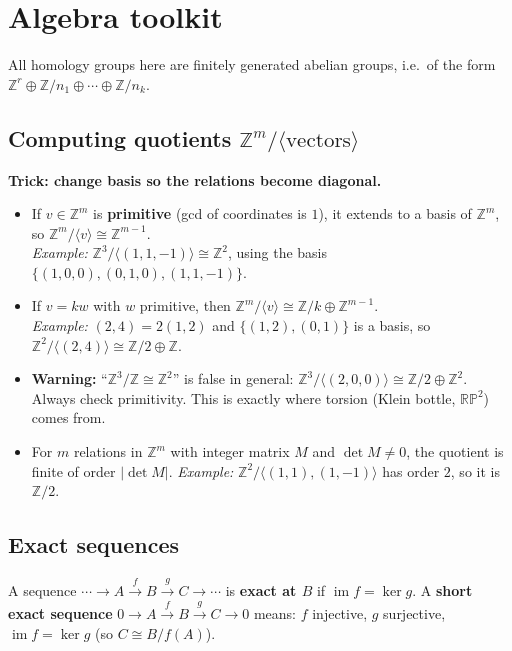 \documentclass[11pt]{article}
\newcommand{\Z}{\mathbb Z}
\newcommand{\RP}{\mathbb{RP}}
\newcommand{\im}{\operatorname{im}}
\theoremstyle{definition}
\begin{document}
\section{Algebra toolkit}

All homology groups here are finitely generated abelian groups, i.e.\ of the form $\Z^r\oplus\Z/n_1\oplus\cdots\oplus\Z/n_k$.

\subsection{Computing quotients $\Z^m/\langle\text{vectors}\rangle$}
\textbf{Trick: change basis so the relations become diagonal.}
\begin{itemize}
\item If $v\in\Z^m$ is \textbf{primitive} (gcd of coordinates is $1$), it extends to a basis of $\Z^m$, so $\Z^m/\langle v\rangle\cong\Z^{m-1}$.\\
\emph{Example:} $\Z^3/\langle(1,1,-1)\rangle\cong\Z^2$, using the basis $\{(1,0,0),(0,1,0),(1,1,-1)\}$.
\item If $v=k w$ with $w$ primitive, then $\Z^m/\langle v\rangle\cong\Z/k\oplus\Z^{m-1}$.\\
\emph{Example:} $(2,4)=2(1,2)$ and $\{(1,2),(0,1)\}$ is a basis, so $\Z^2/\langle(2,4)\rangle\cong\Z/2\oplus\Z$.
\item \textbf{Warning:} ``$\Z^3/\Z\cong\Z^2$'' is false in general: $\Z^3/\langle(2,0,0)\rangle\cong\Z/2\oplus\Z^2$. Always check primitivity. This is exactly where torsion (Klein bottle, $\RP^2$) comes from.
\item For $m$ relations in $\Z^m$ with integer matrix $M$ and $\det M\ne0$, the quotient is finite of order $|\det M|$. \emph{Example:} $\Z^2/\langle(1,1),(1,-1)\rangle$ has order $2$, so it is $\Z/2$.
\end{itemize}

\subsection{Exact sequences}
A sequence $\cdots\to A\xrightarrow{f}B\xrightarrow{g}C\to\cdots$ is \textbf{exact at $B$} if $\im f=\ker g$. A \textbf{short exact sequence} $0\to A\xrightarrow{f}B\xrightarrow{g}C\to0$ means: $f$ injective, $g$ surjective, $\im f=\ker g$ (so $C\cong B/f(A)$).
\end{document}

